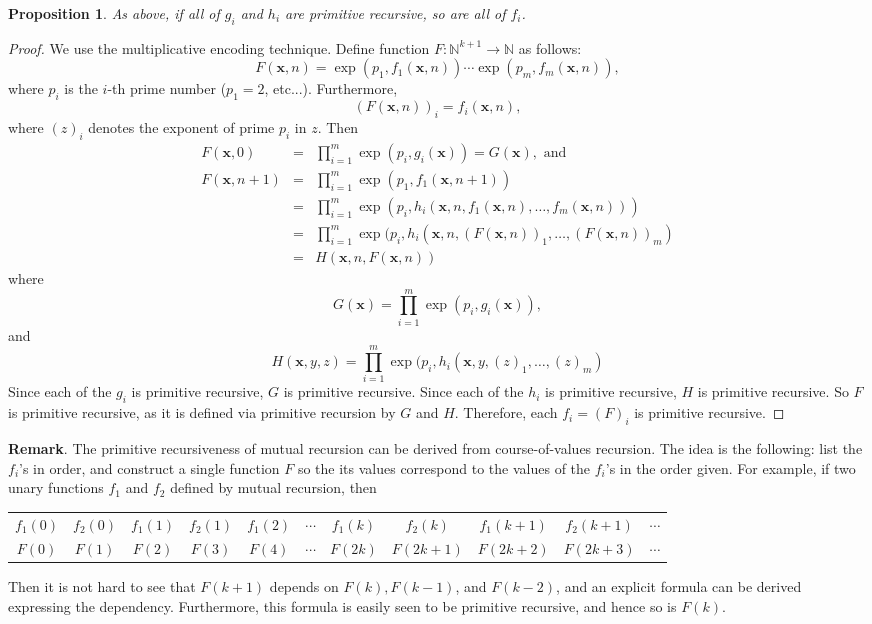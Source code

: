 \documentclass[12pt]{article}
\newtheorem{prop}{Proposition}
\begin{document}
\begin{prop} As above, if all of $g_i$ and $h_i$ are primitive recursive, so are all of $f_i$. \end{prop}
\begin{proof}  We use the multiplicative encoding technique.  Define function $F:\mathbb{N}^{k+1} \to \mathbb{N}$ as follows:
$$F(\boldsymbol{x},n)=\operatorname{exp}(p_1, f_1(\boldsymbol{x},n))\cdots \operatorname{exp}(p_m, f_m(\boldsymbol{x},n)),$$
where $p_i$ is the $i$-th prime number ($p_1=2$, etc...).  Furthermore, $$(F(\boldsymbol{x},n))_i = f_i(\boldsymbol{x},n),$$
where $(z)_i$ denotes the exponent of prime $p_i$ in $z$.  Then 
\begin{eqnarray*}
F(\boldsymbol{x},0) &=& \prod_{i=1}^m \operatorname{exp}(p_i, g_i(\boldsymbol{x})) = G(\boldsymbol{x}), \mbox{ and} \\
F(\boldsymbol{x},n+1) &=& \prod_{i=1}^m \operatorname{exp}(p_1, f_1(\boldsymbol{x},n+1)) \\
&=& \prod_{i=1}^m \operatorname{exp}(p_i, h_i(\boldsymbol{x},n,f_1(\boldsymbol{x},n),\ldots, f_m(\boldsymbol{x},n))) \\
&=& \prod_{i=1}^m \operatorname{exp}(p_i, h_i(\boldsymbol{x},n, (F(\boldsymbol{x},n))_1,\ldots, (F(\boldsymbol{x},n))_m) \\
&=& H(\boldsymbol{x},n, F(\boldsymbol{x},n))
\end{eqnarray*}
where $$G(\boldsymbol{x}) = \prod_{i=1}^m \operatorname{exp}(p_i, g_i(\boldsymbol{x})),$$ and 
$$H(\boldsymbol{x},y,z) = \prod_{i=1}^m \operatorname{exp}(p_i, h_i(\boldsymbol{x},y, (z)_1,\ldots, (z)_m) $$
Since each of the $g_i$ is primitive recursive, $G$ is primitive recursive.  Since each of the $h_i$ is primitive recursive, $H$ is primitive recursive.  So $F$ is primitive recursive, as it is defined via primitive recursion by $G$ and $H$.  Therefore, each $f_i = (F)_i$ is primitive recursive.
\end{proof}

\textbf{Remark}.  The primitive recursiveness of mutual recursion can be derived from course-of-values recursion.  The idea is the following: list the $f_i$'s in order, and construct a single function $F$ so the its values correspond to the values of the $f_i$'s in the order given.  For example, if two unary functions $f_1$ and $f_2$ defined by mutual recursion, then 
\begin{center}
\begin{tabular}{c c c c c c c c c c c}
$f_1(0)$ & $f_2(0)$ & $f_1(1)$ & $f_2(1)$ & $f_1(2)$ & $\cdots$ & $f_1(k)$ & $f_2(k)$ & $f_1(k+1)$ & $f_2(k+1)$ & $\cdots$ \\
$F(0)$ & $F(1)$ & $F(2)$ & $F(3)$ & $F(4)$ & $\cdots$ & $F(2k)$ & $F(2k+1)$ & $F(2k+2)$ & $F(2k+3)$ &  $\cdots$ \\
\end{tabular}
\end{center}
Then it is not hard to see that $F(k+1)$ depends on $F(k),F(k-1)$, and $F(k-2)$, and an explicit formula can be derived expressing the dependency.  Furthermore, this formula is easily seen to be primitive recursive, and hence so is $F(k)$.
\end{document}
